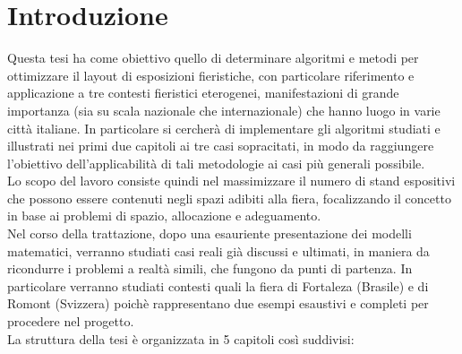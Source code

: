 \documentclass[12pt,a4paper,openright,twoside]{report}
\begin{document}
\chapter*{Introduzione}                 %
Questa tesi ha come obiettivo quello di determinare algoritmi e metodi per ottimizzare il layout di esposizioni fieristiche, con particolare riferimento e applicazione a tre contesti fieristici eterogenei, manifestazioni di grande importanza (sia su scala nazionale che internazionale) che hanno luogo in varie citt\`{a} italiane. In particolare si cercher\`{a} di implementare gli algoritmi studiati e illustrati nei primi due capitoli ai tre casi sopracitati, in modo da raggiungere l'obiettivo dell'applicabilit\`{a} di tali metodologie ai casi pi\`{u} generali possibile.\\
Lo scopo del lavoro consiste quindi nel massimizzare il numero di stand espositivi che possono essere contenuti negli spazi adibiti alla fiera, focalizzando il concetto in base ai problemi di spazio, allocazione e adeguamento.\\
Nel corso della trattazione, dopo una esauriente presentazione dei modelli matematici, verranno studiati casi reali gi\`{a} discussi e ultimati, in maniera da ricondurre i problemi a realt\`{a} simili, che fungono da punti di partenza. In particolare verranno studiati contesti quali la fiera di Fortaleza (Brasile) e di Romont (Svizzera) poich\`{e} rappresentano due esempi esaustivi e completi per procedere nel progetto.\\
La struttura della tesi \`{e} organizzata in 5 capitoli cos\`{i} suddivisi:
\end{document}
